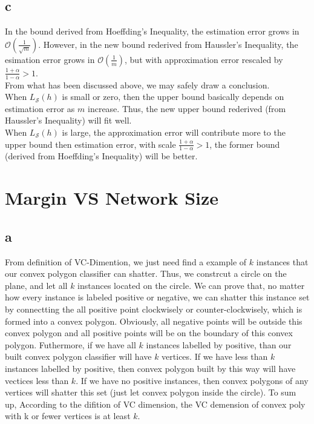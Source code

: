 \documentclass{article}
\begin{document}
	\subsection{c}
	In the bound derived from Hoeffding's Inequality, the estimation error grows in $\mathcal{O}(\frac{1}{\sqrt{m}})$. However, in the new bound rederived from Haussler's Inequality, the esimation error grows in $\mathcal{O}(\frac{1}{m})$, but with approximation error rescaled by $\frac{1+\alpha}{1-\alpha}>1$.\\
	From what has been discussed above, we may safely draw a conclusion.\\
	When $L_{\mathcal{S}}(h)$ is small or zero, then the upper bound basically depends on estimation error as $m$ increase. Thus, the new upper bound rederived (from Haussler's Inequality) will fit well.\\ 
	When $L_{\mathcal{S}}(h)$ is large, the approximation error will contribute more to the upper bound then estimation error, with scale $\frac{1+\alpha}{1-\alpha}>1$, the former bound (derived from Hoeffding's Inequality) will be better.\\

	\section{Margin VS Network Size}
	\subsection{a}
	From definition of VC-Dimention, we just need find a example of $k$ instances that our convex polygon classifier can shatter. Thus, we constrcut a circle on the plane, and let all $k$ instances located on the circle. We can prove that, no matter how every instance is labeled positive or negative, we can shatter this instance set by connectting the all positive point clockwisely or counter-clockwisely, which is formed into a convex polygon. Obviously, all negative points will be outside this convex polygon and all positive points will be on the boundary of this convex polygon. Futhermore, if we have all $k$ instances labelled by positive, than our built convex polygon classifier will have $k$ vertices. If we have less than $k$ instances labelled by positive, then convex polygon built by this way will have vectices less than $k$. If we have no positive instances, then convex polygons of any vertices will shatter this set (just let convex polygon inside the circle). To sum up, According to the difition of VC dimension, the VC demension of convex poly with k or fewer vertices is at least $k$.
\end{document}
